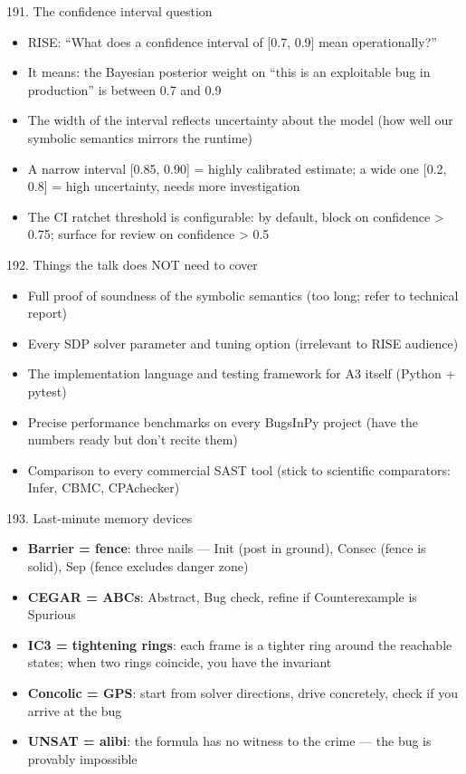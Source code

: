 \documentclass[aspectratio=169]{beamer}
\begin{document}
\begin{frame}{191. The confidence interval question}
\begin{itemize}
  \item RISE: ``What does a confidence interval of [0.7, 0.9] mean operationally?''
  \item It means: the Bayesian posterior weight on ``this is an exploitable bug in production'' is between 0.7 and 0.9
  \item The width of the interval reflects uncertainty about the model (how well our symbolic semantics mirrors the runtime)
  \item A narrow interval [0.85, 0.90] = highly calibrated estimate; a wide one [0.2, 0.8] = high uncertainty, needs more investigation
  \item The CI ratchet threshold is configurable: by default, block on confidence > 0.75; surface for review on confidence > 0.5
\end{itemize}
\end{frame}

\begin{frame}{192. Things the talk does NOT need to cover}
\begin{itemize}
  \item Full proof of soundness of the symbolic semantics (too long; refer to technical report)
  \item Every SDP solver parameter and tuning option (irrelevant to RISE audience)
  \item The implementation language and testing framework for A3 itself (Python + pytest)
  \item Precise performance benchmarks on every BugsInPy project (have the numbers ready but don't recite them)
  \item Comparison to every commercial SAST tool (stick to scientific comparators: Infer, CBMC, CPAchecker)
\end{itemize}
\end{frame}

\begin{frame}{193. Last-minute memory devices}
\begin{itemize}
  \item \textbf{Barrier = fence}: three nails --- Init (post in ground), Consec (fence is solid), Sep (fence excludes danger zone)
  \item \textbf{CEGAR = ABCs}: Abstract, Bug check, refine if Counterexample is Spurious
  \item \textbf{IC3 = tightening rings}: each frame is a tighter ring around the reachable states; when two rings coincide, you have the invariant
  \item \textbf{Concolic = GPS}: start from solver directions, drive concretely, check if you arrive at the bug
  \item \textbf{UNSAT = alibi}: the formula has no witness to the crime --- the bug is provably impossible
\end{itemize}
\end{frame}
\end{document}
